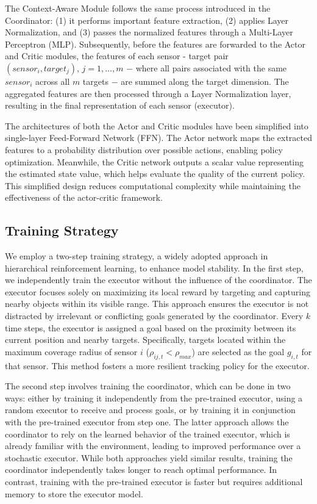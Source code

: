 \documentclass[preprint,12pt]{elsarticle}
\begin{document}
The Context-Aware Module follows the same process introduced in the Coordinator: (1) it performs important feature extraction, (2) applies Layer Normalization, and (3) passes the normalized features through a Multi-Layer Perceptron (MLP). Subsequently, before the features are forwarded to the Actor and Critic modules, the features of each sensor - target pair $ (sensor_i, target_j), \, j = 1, \dots, m $
$-$ where all pairs associated with the same $sensor_i$ across all $m$ targets $-$ are summed along the target dimension. The aggregated features are then processed through a Layer Normalization layer, resulting in the final representation of each sensor (executor).

The architectures of both the Actor and Critic modules have been simplified into single-layer Feed-Forward Network (FFN). The Actor network maps the extracted features to a probability distribution over possible actions, enabling policy optimization. Meanwhile, the Critic network outputs a scalar value representing the estimated state value, which helps evaluate the quality of the current policy. This simplified design reduces computational complexity while maintaining the effectiveness of the actor-critic framework.

\subsection{Training Strategy}
We employ a two-step training strategy, a widely adopted approach in hierarchical reinforcement learning, to enhance model stability. In the first step, we independently train the executor without the influence of the coordinator. The executor focuses solely on maximizing its local reward by targeting and capturing nearby objects within its visible range. This approach ensures the executor is not distracted by irrelevant or conflicting goals generated by the coordinator. Every $k$ time steps, the executor is assigned a goal based on the proximity between its current position and nearby targets. Specifically, targets located within the maximum coverage radius of sensor $i$ ($\rho_{ij,t}<\rho_{max}$) are selected as the goal $g_{i,t}$ for that sensor. This method fosters a more resilient tracking policy for the executor.

The second step involves training the coordinator, which can be done in two ways: either by training it independently from the pre-trained executor, using a random executor to receive and process goals, or by training it in conjunction with the pre-trained executor from step one. The latter approach allows the coordinator to rely on the learned behavior of the trained executor, which is already familiar with the environment, leading to improved performance over a stochastic executor. While both approaches yield similar results, training the coordinator independently takes longer to reach optimal performance. In contrast, training with the pre-trained executor is faster but requires additional memory to store the executor model.
\end{document}
